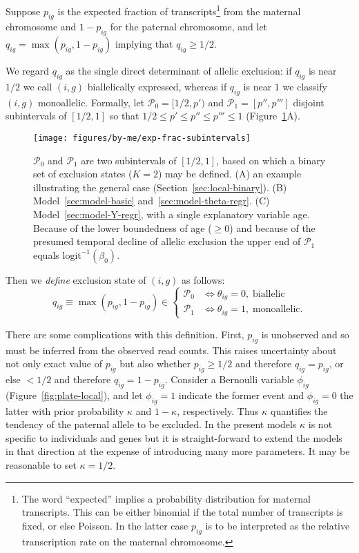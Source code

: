 \documentclass[letterpaper]{article}
\begin{document}
Suppose \(p_{ig}\) is the expected fraction of transcripts\footnote{The word
``expected'' implies a probability distribution for maternal transcripts.
This can be either binomial if the total number of transcripts is fixed, or
else Poisson.  In the latter case \(p_{ig}\) is to be interpreted as the
relative transcription rate on the maternal chromosome. } from the maternal
chromosome and \(1-p_{ig}\) for the paternal chromosome, and let
\(q_{ig}=\max(p_{ig},1-p_{ig})\) implying that \(q_{ig}\ge 1/2\).

We regard \(q_{ig}\) as the single direct determinant of
allelic exclusion: if \(q_{ig}\) is near \(1/2\) we call \((i,g)\)
biallelically expressed, whereas if \(q_{ig}\) is near \(1\) we classify
\((i,g)\) monoallelic.  Formally, let \(\mathcal{P}_0 = [1/2, p')\) and
\(\mathcal{P}_1 = [p'', p''']\) disjoint subintervals of \([1/2,1]\) so that
\(1/2\le p'\le p''\le p'''\le 1\) (Figure~\ref{fig:P-intervals}A).

\begin{figure}[t]
\begin{center}
\texttt{[image: figures/by-me/exp-frac-subintervals]}
\caption{
\(\mathcal{P}_0\) and \(\mathcal{P}_1\) are two subintervals of \([1/2,1]\),
based on which a binary set of exclusion states (\(K=2\)) may be defined.  (A)
an example illustrating the general case (Section~\ref{sec:local-binary}). (B)
Model~\ref{sec:model-basic} and~\ref{sec:model-theta-regr}.  (C)
Model~\ref{sec:model-Y-regr}, with a single explanatory variable age.  Because
of the lower boundedness of age (\(\ge 0\)) and because of the presumed
temporal decline of allelic exclusion the upper end of \(\mathcal{P}_1\)
equals \(\mathrm{logit}^{-1}(\beta_0)\).
}
\label{fig:P-intervals}
\end{center}
\end{figure}

Then we \emph{define} exclusion state of \((i,g)\) as follows:
\begin{equation}
\label{eq:def-exclusion-state}
q_{ig} \equiv \max(p_{ig},1-p_{ig}) \in
\begin{cases}
\mathcal{P}_0 & \Leftrightarrow \theta_{ig}=0, \; \text{biallelic} \\
\mathcal{P}_1 & \Leftrightarrow \theta_{ig}=1, \; \text{monoallelic}.
\end{cases}
\end{equation}

There are some complications with this definition.  First, \(p_{ig}\) is
unobserved and so must be inferred from the observed read counts.  This raises
uncertainty about not only exact value of \(p_{ig}\) but also whether
\(p_{ig}\ge 1/2\) and therefore \(q_{ig}=p_{ig}\), or else \(<1/2\) and therefore
\(q_{ig}=1-p_{ig}\).  Consider a Bernoulli variable \(\phi_{ig}\)
(Figure~\ref{fig:plate-local}), and let \(\phi_{ig}=1\) indicate the former event and
\(\phi_{ig}=0\) the latter with prior probability \(\kappa\) and
\(1-\kappa\), respectively.  Thus \(\kappa\) quantifies the tendency of the
paternal allele to be excluded. In the present models \(\kappa\) is not
specific to individuals and genes but it is straight-forward to extend the
models in that direction at the expense of introducing many more parameters.
It may be reasonable to set \(\kappa=1/2\).
\end{document}
